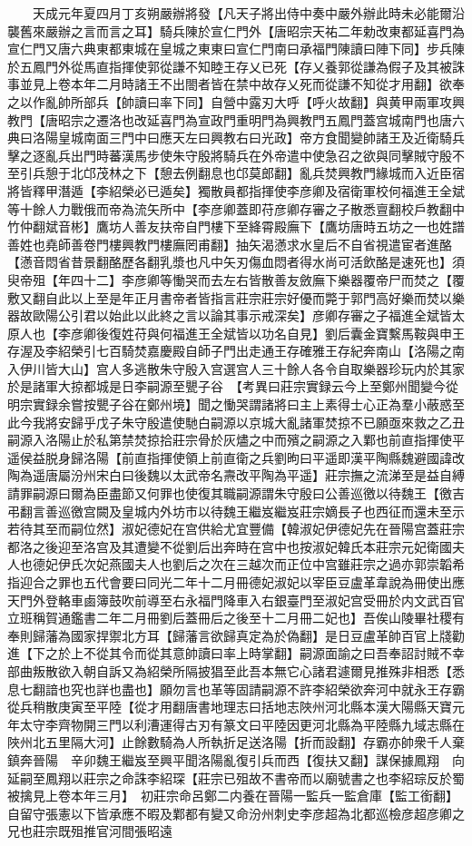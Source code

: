 　　天成元年夏四月丁亥朔嚴辦將發【凡天子將出侍中奏中嚴外辦此時未必能爾沿襲舊來嚴辦之言而言之耳】騎兵陳於宣仁門外【唐昭宗天祐二年勅改東都延喜門為宣仁門又唐六典東都東城在皇城之東東曰宣仁門南曰承福門陳讀曰陣下同】步兵陳於五鳳門外從馬直指揮使郭從謙不知睦王存乂已死【存乂養郭從謙為假子及其被誅事並見上卷本年二月時諸王不出閤者皆在禁中故存乂死而從謙不知從才用翻】欲奉之以作亂帥所部兵【帥讀曰率下同】自營中露刃大呼【呼火故翻】與黄甲兩軍攻興教門【唐昭宗之遷洛也改延喜門為宣政門重明門為興教門五鳳門蓋宫城南門也唐六典曰洛陽皇城南面三門中曰應天左曰興教右曰光政】帝方食聞變帥諸王及近衛騎兵擊之逐亂兵出門時蕃漢馬步使朱守殷將騎兵在外帝遣中使急召之欲與同擊賊守殷不至引兵憩于北邙茂林之下【憩去例翻息也邙莫郎翻】亂兵焚興教門緣城而入近臣宿將皆釋甲潛遁【李紹榮必已遁矣】獨散員都指揮使李彦卿及宿衛軍校何福進王全斌等十餘人力戰俄而帝為流矢所中【李彦卿蓋即苻彦卿存審之子散悉亶翻校戶教翻中竹仲翻斌音彬】鷹坊人善友扶帝自門樓下至絳霄殿廡下【鷹坊唐時五坊之一也姓譜善姓也堯師善卷門樓興教門樓廡罔甫翻】抽矢渴懣求水皇后不自省視遣宦者進酪【懣音悶省昔景翻酪歷各翻乳漿也凡中矢刃傷血悶者得水尚可活飲酪是速死也】須臾帝殂【年四十二】李彦卿等慟哭而去左右皆散善友斂廡下樂器覆帝尸而焚之【覆敷又翻自此以上至是年正月書帝者皆指言莊宗莊宗好優而斃于郭門高好樂而焚以樂器故歐陽公引君以始此以此終之言以論其事示戒深矣】彦卿存審之子福進全斌皆太原人也【李彦卿後復姓苻與何福進王全斌皆以功名自見】劉后囊金寶繫馬鞍與申王存渥及李紹榮引七百騎焚嘉慶殿自師子門出走通王存確雅王存紀奔南山【洛陽之南入伊川皆大山】宫人多逃散朱守殷入宫選宫人三十餘人各令自取樂器珍玩内於其家於是諸軍大掠都城是日李嗣源至甖子谷　【考異曰莊宗實録云今上至鄭州聞變今從明宗實録余嘗按甖子谷在鄭州境】聞之慟哭謂諸將曰主上素得士心正為羣小蔽惑至此今我將安歸乎戊子朱守殷遣使馳白嗣源以京城大亂諸軍焚掠不已願亟來救之乙丑嗣源入洛陽止於私第禁焚掠拾莊宗骨於灰燼之中而殯之嗣源之入鄴也前直指揮使平遥侯益脱身歸洛陽【前直指揮使領上前直衛之兵劉昫曰平遥即漢平陶縣魏避國諱改陶為遥唐屬汾州宋白曰後魏以太武帝名燾改平陶為平遥】莊宗撫之流涕至是益自縛請罪嗣源曰爾為臣盡節又何罪也使復其職嗣源謂朱守殷曰公善巡徼以待魏王【徼吉弔翻言善巡徼宫闕及皇城内外坊市以待魏王繼岌繼岌莊宗嫡長子也西征而還未至示若待其至而嗣位然】淑妃德妃在宫供給尤宜豐備【韓淑妃伊德妃先在晉陽宫蓋莊宗都洛之後迎至洛宫及其遭變不從劉后出奔時在宫中也按淑妃韓氏本莊宗元妃衛國夫人也德妃伊氏次妃燕國夫人也劉后之次在三越次而正位中宫雖莊宗之過亦郭崇韜希指迎合之罪也五代會要曰同光二年十二月冊德妃淑妃以宰臣豆盧革韋說為冊使出應天門外登輅車鹵簿鼓吹前導至右永福門降車入右銀臺門至淑妃宫受冊於内文武百官立班稱賀通鑑書二年二月冊劉后蓋冊后之後至十二月冊二妃也】吾俟山陵畢社稷有奉則歸藩為國家捍禦北方耳【歸藩言欲歸真定為於偽翻】是日豆盧革帥百官上牋勸進【下之於上不從其令而從其意帥讀曰率上時掌翻】嗣源面諭之曰吾奉詔討賊不幸部曲叛散欲入朝自訴又為紹榮所隔披猖至此吾本無它心諸君遽爾見推殊非相悉【悉息七翻諳也究也詳也盡也】願勿言也革等固請嗣源不許李紹榮欲奔河中就永王存霸從兵稍散庚寅至平陸【從才用翻唐書地理志曰括地志陜州河北縣本漢大陽縣天寶元年太守李齊物開三門以利漕運得古刃有篆文曰平陸因更河北縣為平陸縣九域志縣在陜州北五里隔大河】止餘數騎為人所執折足送洛陽【折而設翻】存霸亦帥衆千人棄鎮奔晉陽　辛卯魏王繼岌至興平聞洛陽亂復引兵而西【復扶又翻】謀保據鳳翔　向延嗣至鳳翔以莊宗之命誅李紹琛【莊宗已殂故不書帝而以廟號書之也李紹琮反於蜀被擒見上卷本年三月】　初莊宗命呂鄭二内養在晉陽一監兵一監倉庫【監工銜翻】自留守張憲以下皆承應不暇及鄴都有變又命汾州刺史李彦超為北都巡檢彦超彦卿之兄也莊宗既殂推官河間張昭遠